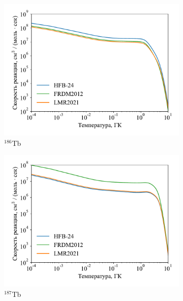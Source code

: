 \begin{figure}
\begin{subfigure}{0.48\textwidth}
    \includegraphics[width=\textwidth]{pics/rate_tb186.pdf}
    \caption{${}^{186}$Tb}
  \end{subfigure}
  \hfil
  \begin{subfigure}{0.48\textwidth}
    \centering
    \includegraphics[width=\textwidth]{pics/rate_tb187.pdf}
    \caption{${}^{187}$Tb}
  \end{subfigure}
  \\
  \begin{subfigure}{0.48\textwidth}
    \centering

\end{subfigure}
\end{figure}
